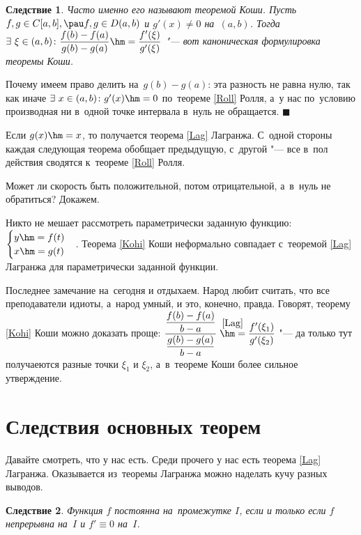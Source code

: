 \documentclass[a4paper,10pt,twoside]{article}
\newtheorem{Sl}{Следствие}[section]
\newenvironment{Proof}
       {\par\noindent{\textbf{Доказательство.}}}
       {\hfill$\scriptstyle\blacksquare$}
\let\AVsection\section{}
\renewcommand\section{\newpage\scol\AVsection}
\newcommand{\scol}{  \renewcommand{\headrulewidth}{0.5pt}\fancyhead[RE,LO]{\thesection{} \leftmark} \fancyhead[LE,RO]{\thepage}}
\begin{document}
\begin{Sl}
    Часто именно его называют теоремой Коши. Пусть $f,g\in C[a,b],\pau f,g\in D(a,b)$ и $g'(x)\neq0$ на~$(a,b)$. Тогда
    $\exists\  \xi\in(a,b)\colon\dfrac{f(b)-f(a)}{g(b)-g(a)}\hm=\dfrac{f'(\xi)}{g'(\xi)}$ "--- вот каноническая формулировка теоремы Коши.
\end{Sl}

\begin{Proof}
    Почему имеем право делить на~$g(b)-g(a)$: эта разность не равна нулю, так как иначе $\exists\  x\in(a,b)\colon g'(x)\hm=0$ по~теореме \ref{Roll} Ролля,
    а~у нас по~условию производная ни в~одной точке интервала в~нуль не обращается.
\end{Proof}

Если $g(x)\hm=x$, то получается теорема \ref{Lag} Лагранжа. С~одной стороны каждая следующая теорема обобщает предыдущую, с~другой "--- все в~пол действия
сводятся к~теореме \ref{Roll} Ролля.

Может ли скорость быть положительной, потом отрицательной, а~в~нуль не обратиться? Докажем.

Никто не мешает рассмотреть параметрически заданную функцию: $\begin{cases}y\hm=f(t)\\x\hm=g(t)\end{cases}$. Теорема \ref{Kohi} Коши неформально совпадает с~теоремой
\ref{Lag} Лагранжа для параметрически заданной функции.

Последнее замечание на~сегодня и отдыхаем. Народ любит считать, что все преподаватели идиоты, а~народ умный, и это, конечно, правда. Говорят, теорему \ref{Kohi} Коши
можно доказать проще: $\dfrac{\dfrac{f(b)-f(a)}{b-a}}{\dfrac{g(b)-g(a)}{b-a}}\overset{\ref{Lag}}{\hm=}\dfrac{f'(\xi_1)}{g'(\xi_2)}$ "--- да только тут получаеются
разные точки $\xi_1$ и $\xi_2$, а~в~теореме Коши более сильное утверждение.


\section{Следствия основных теорем}

Давайте смотреть, что у нас есть. Среди прочего у нас есть теорема \ref{Lag} Лагранжа. Оказывается из~теоремы Лагранжа можно наделать кучу разных выводов.

\begin{Sl}\label{LS1}
    Функция $f$ постоянна на~промежутке $I$, если и только если $f$ непрерывна на~$I$ и $f'\equiv0$ на~$I$.
\end{Sl}
\end{document}
